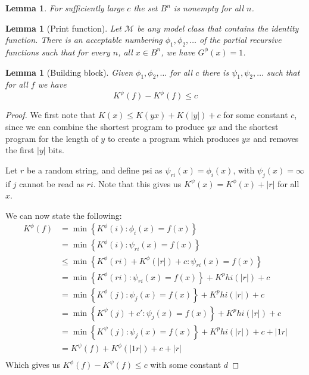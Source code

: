 \documentclass{article}
\newtheorem{lemma}[theorem]{Lemma}
\newcommand{\M}{\mathcal M}
\begin{document}
\begin{lemma}
  For sufficiently large $c$ the set $B^n$ is nonempty for all $n$.
\end{lemma}

\begin{lemma}[Print function]
  Let $\M$ be any model class that contains the identity function. There is an acceptable numbering $\phi_1,\phi_2,\ldots$ of the partial recursive functions such that for every $n$, all $x\in B^n$, 
we have $G^\phi(x)=1$.
\end{lemma}


\begin{lemma}[Building block]
Given $\phi_1,\phi_2,\ldots$ for all $c$ there is $\psi_1,\psi_2,\ldots$ such that for all $f$ we have
\[
K^\psi(f) - K^\phi(f) \le c
\]
\end{lemma}
\begin{proof}
We first note that $K(x) \leq K(yx) + K(|y|) + c$ for some constant $c$, since we can combine the shortest program to produce $yx$ and the shortest program for the length of $y$ to create a program which produces $yx$ and removes the first $|y|$ bits.

Let $r$ be a random string, and define psi as $\psi_{ri}(x) = \phi_{i}(x)$, with $\psi_{j}(x) = \infty$ if $j$ cannot be read as $ri$. Note that this gives us $K^\psi(x) = K^\phi(x) + |r|$ for all $x$.

We can now state the following:
\[\begin{split}
K^\phi(f) &= \min\left\{ K^\phi(i) : \phi_i(x) = f(x) \right\} \\
       &= \min\left\{ K^\phi(i) : \psi_{ri}(x) = f(x) \right\} \\
       &\leq \min\left\{ K^\phi(ri) + K^\phi(|r|) + c : \psi_{ri}(x) = f(x) \right\} \\
       &= \min\left\{ K^\phi(ri) : \psi_{ri}(x) = f(x) \right\} + K^phi(|r|) + c \\
       &= \min\left\{ K^\phi(j) : \psi_{j}(x) = f(x) \right\} + K^phi(|r|) + c \\
       &= \min\left\{ K^\psi(j) + c' : \psi_{j}(x) = f(x) \right\} + K^phi(|r|) + c \\
       &= \min\left\{ K^\psi(j) : \psi_{j}(x) = f(x) \right\} + K^phi(|r|) + c + |1r|\\
       &= K^\psi(f) + K^\phi(|1r|) + c + |r|\\
\end{split}\]
Which gives us $K^\phi(f) - K^\psi(f) \leq c$ with some constant $d$
\end{proof}





\end{document}
